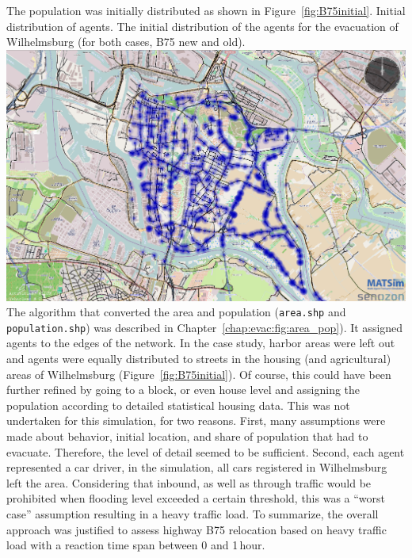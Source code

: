 The population was initially distributed as shown in Figure~\ref{fig:B75initial}. 
%
\createfigure%
{Initial distribution of agents.}%
{The initial distribution of the agents for the evacuation of Wilhelmsburg (for both cases, B75 new and old).}%
{\label{fig:B75initial}}%
{\includegraphics[width=0.7\linewidth]{scenarios/figures/B75initial}}%
{}
The algorithm that converted the area and population (\ie \lstinline|area.shp| and \lstinline|population.shp|) was described in Chapter~\ref{chap:evac:fig:area_pop}). It assigned agents to the edges of the network. In the case study, harbor areas were left out and agents were equally distributed to streets in the housing (and agricultural) areas of Wilhelmsburg (Figure~\ref{fig:B75initial}).
Of course, this could have been further refined by going to a block, or even house level and assigning the population according to detailed statistical housing data. This was not undertaken for this simulation, for two reasons. First, many assumptions were made about behavior, initial location, and share of population that had to evacuate. Therefore, the level of detail seemed to be sufficient. Second, each agent represented a car driver, \ie in the simulation, all cars registered in Wilhelmsburg left the area. Considering that inbound, as well as through traffic would be prohibited when flooding level exceeded a certain threshold, this was a ``worst case'' assumption resulting in a heavy traffic load. To summarize, the overall approach was justified to assess highway B75 relocation based on heavy traffic load with a reaction time span between 0 and 1\,hour.

